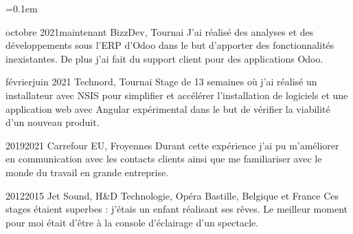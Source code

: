 \begin{indentsection}{\parindent}
  \parskip=0.1em
  \item[]
  {octobre 2021}{maintenant}
  {BizzDev, Tournai}
  {J'ai réalisé des analyses et des développements sous l'ERP d'Odoo dans le but d'apporter des fonctionnalités inexistantes. De plus j'ai fait du support client pour des applications Odoo.}

  \item[]
  {février}{juin 2021}
  {Technord, Tournai}
  {Stage de 13 semaines où j’ai réalisé un installateur avec NSIS pour simplifier et accélérer l’installation de logiciels et une application web avec Angular expérimental dans le but de vérifier la viabilité d’un nouveau produit.}

  \item[]
  {2019}{2021}
  {Carrefour EU, Froyennes}
  {Durant cette expérience j'ai pu m'améliorer en communication avec les contacts clients ainsi que me familiariser avec le monde du travail en grande entreprise.}

  \item[]
  {2012}{2015}
  {Jet Sound, H\&D Technologie, Opéra Bastille, Belgique et France}
  {Ces stages étaient superbes : j'étais un enfant réalisant ses rêves. Le meilleur moment pour moi était d'être à la console d'éclairage d'un spectacle.}
\end{indentsection}
